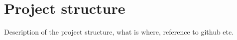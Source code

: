 \chapter{Project structure}
\label{app:project_structure}
Description of the project structure, what is where, reference to github etc.
